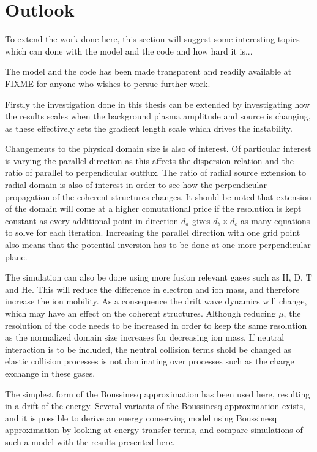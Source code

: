 \section*{Outlook}
%
To extend the work done here, this section will suggest some interesting topics which can done with the model and the code and how hard it is...

The model and the code has been made transparent and readily available at \href{FIXME}{FIXME} for anyone who wishes to persue further work.

Firstly the investigation done in this thesis can be extended by investigating how the results scales when the background plasma amplitude and source is changing, as these effectively sets the gradient length scale which drives the instability.

Changements to the physical domain size is also of interest.
Of particular interest is varying the parallel direction as this affects the dispersion relation and the ratio of parallel to perpendicular outflux.
The ratio of radial source extension to radial domain is also of interest in order to see how the perpendicular propagation of the coherent structures changes.
It should be noted that extension of the domain will come at a higher comutational price if the resolution is kept constant as every additional point in direction $d_a$ gives $d_b\times d_c$ as many equations to solve for each iteration.
Increasing the parallel direction with one grid point also means that the potential inversion has to be done at one more perpendicular plane.

The simulation can also be done using more fusion relevant gases such as $\text{H}$, $\text{D}$, $\text{T}$ and $\text{He}$.
This will reduce the difference in electron and ion mass, and therefore increase the ion mobility.
As a consequence the drift wave dynamics will change, which may have an effect on the coherent structures.
Although reducing $\mu$, the resolution of the code needs to be increased in order to keep the same resolution as the normalized domain size increases for decreasing ion mass.
If neutral interaction is to be included, the neutral collision terms shold be changed as elastic collision processes is not dominating over processes such as the charge exchange in these gases.

The simplest form of the Boussinesq approximation has been used here, resulting in a drift of the energy.
Several variants of the Boussinesq approximation exists, and it is possible to derive an energy conserving model using Boussinesq approximation by looking at energy transfer terms, and compare simulations of such a model with the results presented here.

